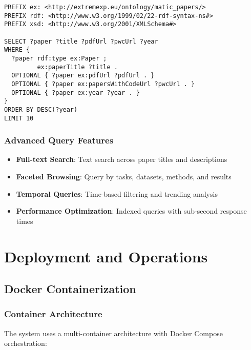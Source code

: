 \documentclass[12pt,a4paper]{article}
\begin{document}
\begin{lstlisting}[language=sparql,caption=Paper Details Query Example]
PREFIX ex: <http://extremexp.eu/ontology/matic_papers/>
PREFIX rdf: <http://www.w3.org/1999/02/22-rdf-syntax-ns#>
PREFIX xsd: <http://www.w3.org/2001/XMLSchema#>

SELECT ?paper ?title ?pdfUrl ?pwcUrl ?year
WHERE {
  ?paper rdf:type ex:Paper ;
         ex:paperTitle ?title .
  OPTIONAL { ?paper ex:pdfUrl ?pdfUrl . }
  OPTIONAL { ?paper ex:papersWithCodeUrl ?pwcUrl . }
  OPTIONAL { ?paper ex:year ?year . }
}
ORDER BY DESC(?year)
LIMIT 10
\end{lstlisting}

\subsubsection{Advanced Query Features}

\begin{itemize}
    \item \textbf{Full-text Search}: Text search across paper titles and descriptions
    \item \textbf{Faceted Browsing}: Query by tasks, datasets, methods, and results
    \item \textbf{Temporal Queries}: Time-based filtering and trending analysis
    \item \textbf{Performance Optimization}: Indexed queries with sub-second response times
\end{itemize}

\section{Deployment and Operations}

\subsection{Docker Containerization}

\subsubsection{Container Architecture}

The system uses a multi-container architecture with Docker Compose orchestration:
\end{document}

